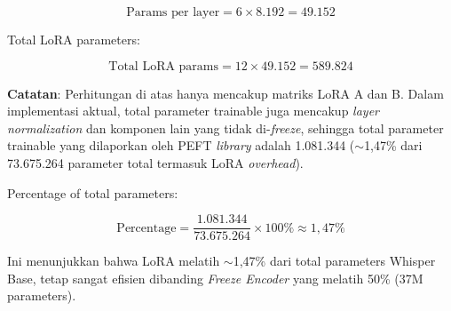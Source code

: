 \vspace{0.3cm}
\begin{equation}
\label{eq:lora_per_layer}
\text{Params per layer} = 6 \times 8.192 = 49.152
\end{equation}
\vspace{0.2cm}

Total LoRA parameters:

\vspace{0.3cm}
\begin{equation}
\label{eq:lora_total}
\text{Total LoRA params} = 12 \times 49.152 = 589.824
\end{equation}
\vspace{0.2cm}

\noindent
\textbf{Catatan}: Perhitungan di atas hanya mencakup matriks LoRA A dan B. Dalam implementasi aktual, total parameter trainable juga mencakup \textit{layer normalization} dan komponen lain yang tidak di-\textit{freeze}, sehingga total parameter trainable yang dilaporkan oleh PEFT \textit{library} adalah 1.081.344 ($\sim$1,47\% dari 73.675.264 parameter total termasuk LoRA \textit{overhead}).

Percentage of total parameters:

\vspace{0.3cm}
\begin{equation}
\label{eq:lora_percentage}
\text{Percentage} = \frac{1.081.344}{73.675.264} \times 100\% \approx 1,47\%
\end{equation}
\vspace{0.2cm}

\noindent
Ini menunjukkan bahwa LoRA melatih $\sim$1,47\% dari total parameters Whisper Base, tetap sangat efisien dibanding \textit{Freeze Encoder} yang melatih 50\% (37M parameters).

\clearpage
\null
\thispagestyle{empty}
\newpage
\clearpage
